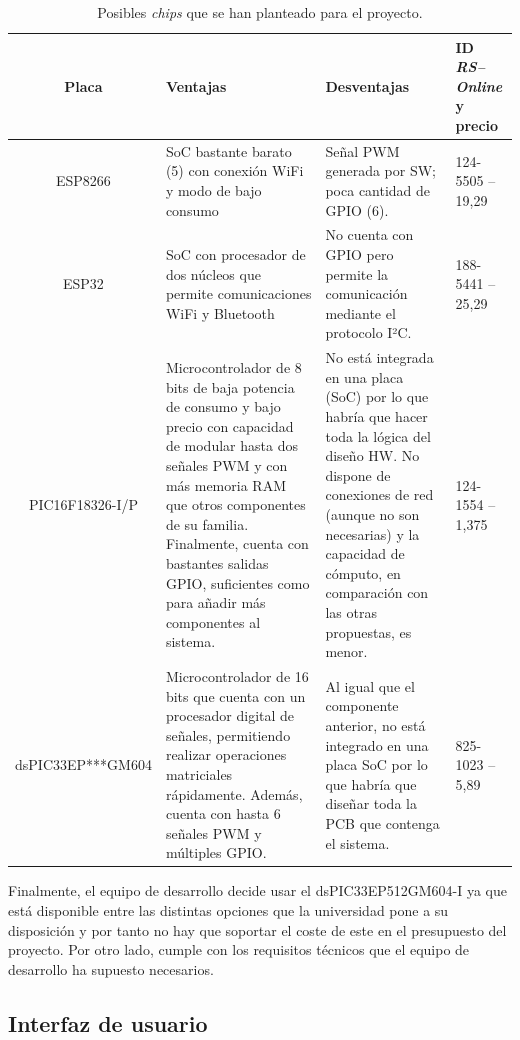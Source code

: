 \begin{table}[H]
    \centering
    \begin{tabularx}{\textwidth}{| c | X | X | X |}
        \hline
        \textbf{Placa} & \textbf{Ventajas} & \textbf{Desventajas} & \textbf{ID \textit{RS--Online} y precio} \\
        \hline
        ESP8266 & \ac{SoC} bastante barato (5\EUR{}) con conexión WiFi y modo de bajo consumo & Señal \ac{PWM} generada por \ac{SW}; poca cantidad de \ac{GPIO} (6). & 124-5505 -- 19,29\EUR{} \\
        \hline
        ESP32 & \ac{SoC} con procesador de dos núcleos que permite comunicaciones WiFi y Bluetooth & No cuenta con \ac{GPIO} pero permite la comunicación mediante el protocolo I²C. & 188-5441 -- 25,29\EUR{} \\
        \hline
        PIC16F18326-I/P & Microcontrolador de 8 bits de baja potencia de consumo y bajo precio con capacidad de modular hasta dos señales \ac{PWM} y con más memoria RAM que otros componentes de su familia. Finalmente, cuenta con bastantes salidas \ac{GPIO}, suficientes como para añadir más componentes al sistema. & No está integrada en una placa (\ac{SoC}) por lo que habría que hacer toda la lógica del diseño \ac{HW}. No dispone de conexiones de red (aunque no son necesarias) y la capacidad de cómputo, en comparación con las otras propuestas, es menor. & 124-1554 -- 1,375\EUR{} \\
        \hline
        dsPIC33EP***GM604 & Microcontrolador de 16 bits que cuenta con un procesador digital de señales, permitiendo realizar operaciones matriciales rápidamente. Además, cuenta con hasta 6 señales \ac{PWM} y múltiples GPIO. & Al igual que el componente anterior, no está integrado en una placa \ac{SoC} por lo que habría que diseñar toda la PCB que contenga el sistema. & 825-1023 -- 5,89\EUR{} \\
        \hline
    \end{tabularx}
    \caption{Posibles \textit{chips} que se han planteado para el proyecto.}
    \label{tab:s2_chips}
\end{table}

Finalmente, el equipo de desarrollo decide usar el dsPIC33EP512GM604-I ya que está disponible entre las distintas opciones que la universidad pone a su disposición y por tanto no hay que soportar el coste de este en el presupuesto del proyecto. Por otro lado, cumple con los requisitos técnicos que el equipo de desarrollo ha supuesto necesarios.

\subsection{Interfaz de usuario}

